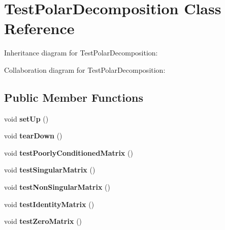 \hypertarget{class_test_polar_decomposition}{\section{Test\+Polar\+Decomposition Class Reference}
\label{class_test_polar_decomposition}
}


Inheritance diagram for Test\+Polar\+Decomposition\+:


Collaboration diagram for Test\+Polar\+Decomposition\+:
\subsection*{Public Member Functions}
\begin{DoxyCompactItemize}
\item 
\hypertarget{class_test_polar_decomposition_a49690cb2435fd4b73e831af4650039e7}{void {\bfseries set\+Up} ()}\label{class_test_polar_decomposition_a49690cb2435fd4b73e831af4650039e7}

\item 
\hypertarget{class_test_polar_decomposition_ad11cf1eec2dd7de43d555f3f16d1d1a9}{void {\bfseries tear\+Down} ()}\label{class_test_polar_decomposition_ad11cf1eec2dd7de43d555f3f16d1d1a9}

\item 
\hypertarget{class_test_polar_decomposition_aa716ffb5747b37886e14e0f12394a4ff}{void {\bfseries test\+Poorly\+Conditioned\+Matrix} ()}\label{class_test_polar_decomposition_aa716ffb5747b37886e14e0f12394a4ff}

\item 
\hypertarget{class_test_polar_decomposition_ae0ccd73d0241ee563e06f37f872cf4a7}{void {\bfseries test\+Singular\+Matrix} ()}\label{class_test_polar_decomposition_ae0ccd73d0241ee563e06f37f872cf4a7}

\item 
\hypertarget{class_test_polar_decomposition_a9567804c56cb55136aede9d7603038c6}{void {\bfseries test\+Non\+Singular\+Matrix} ()}\label{class_test_polar_decomposition_a9567804c56cb55136aede9d7603038c6}

\item 
\hypertarget{class_test_polar_decomposition_adde03cc156c58a2443ddf4b70ffeda5e}{void {\bfseries test\+Identity\+Matrix} ()}\label{class_test_polar_decomposition_adde03cc156c58a2443ddf4b70ffeda5e}

\item 
\hypertarget{class_test_polar_decomposition_a684588c2e6ba376cadd6031295b3ecbb}{void {\bfseries test\+Zero\+Matrix} ()}\label{class_test_polar_decomposition_a684588c2e6ba376cadd6031295b3ecbb}


\end{DoxyCompactItemize}
